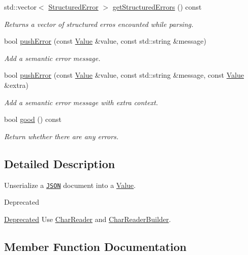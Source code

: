 \begin{DoxyCompactItemize}
std\+::vector$<$ \hyperlink{struct_json_1_1_reader_1_1_structured_error}{Structured\+Error} $>$ \hyperlink{class_json_1_1_reader_a08c2ea5ffc7d2a9c9e35020835624f0b}{get\+Structured\+Errors} () const 
\begin{DoxyCompactList}\small\item\em Returns a vector of structured erros encounted while parsing. \end{DoxyCompactList}\item 
bool \hyperlink{class_json_1_1_reader_ade6c28e0ef00d8f2e0aa2283f91c3e37}{push\+Error} (const \hyperlink{class_json_1_1_value}{Value} \&value, const std\+::string \&message)
\begin{DoxyCompactList}\small\item\em Add a semantic error message. \end{DoxyCompactList}\item 
bool \hyperlink{class_json_1_1_reader_a9b474233c3a7c688e340e70665d45223}{push\+Error} (const \hyperlink{class_json_1_1_value}{Value} \&value, const std\+::string \&message, const \hyperlink{class_json_1_1_value}{Value} \&extra)
\begin{DoxyCompactList}\small\item\em Add a semantic error message with extra context. \end{DoxyCompactList}\item 
bool \hyperlink{class_json_1_1_reader_a06b52dcc656549506b1ae6f05167ecf4}{good} () const 
\begin{DoxyCompactList}\small\item\em Return whether there are any errors. \end{DoxyCompactList}\end{DoxyCompactItemize}


\subsection{Detailed Description}
Unserialize a \href{http://www.json.org}{\tt J\+S\+ON} document into a \hyperlink{class_json_1_1_value}{Value}. 

\begin{DoxyRefDesc}{Deprecated}
\item[\hyperlink{deprecated__deprecated000005}{Deprecated}]Use \hyperlink{class_json_1_1_char_reader}{Char\+Reader} and \hyperlink{class_json_1_1_char_reader_builder}{Char\+Reader\+Builder}. \end{DoxyRefDesc}


\subsection{Member Function Documentation}
